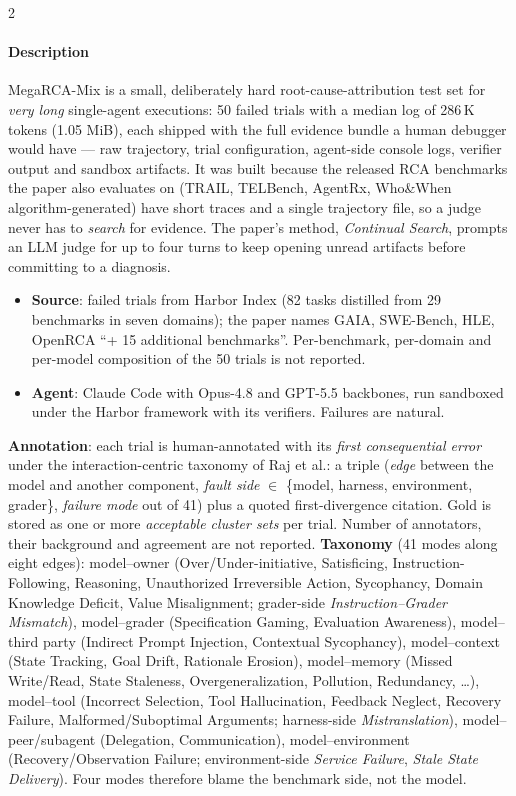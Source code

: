 \begin{multicols}{2}
\paragraph{Description} MegaRCA-Mix is a small, deliberately hard root-cause-attribution test set for \emph{very long} single-agent executions: 50 failed trials with a median log of 286\,K tokens (1.05 MiB), each shipped with the full evidence bundle a human debugger would have --- raw trajectory, trial configuration, agent-side console logs, verifier output and sandbox artifacts. It was built because the released RCA benchmarks the paper also evaluates on (TRAIL, TELBench, AgentRx, Who\&When algorithm-generated) have short traces and a single trajectory file, so a judge never has to \emph{search} for evidence. The paper's method, \emph{Continual Search}, prompts an LLM judge for up to four turns to keep opening unread artifacts before committing to a diagnosis.
\begin{itemize}
\item \textbf{Source}: failed trials from Harbor Index (82 tasks distilled from 29 benchmarks in seven domains); the paper names GAIA, SWE-Bench, HLE, OpenRCA ``+ 15 additional benchmarks''. Per-benchmark, per-domain and per-model composition of the 50 trials is not reported.
\item \textbf{Agent}: Claude Code with Opus-4.8 and GPT-5.5 backbones, run sandboxed under the Harbor framework with its verifiers. Failures are natural.
\end{itemize}
\textbf{Annotation}: each trial is human-annotated with its \emph{first consequential error} under the interaction-centric taxonomy of Raj et al.: a triple (\emph{edge} between the model and another component, \emph{fault side} $\in$ \{model, harness, environment, grader\}, \emph{failure mode} out of 41) plus a quoted first-divergence citation. Gold is stored as one or more \emph{acceptable cluster sets} per trial. Number of annotators, their background and agreement are not reported. \textbf{Taxonomy} (41 modes along eight edges): model--owner (Over/Under-initiative, Satisficing, Instruction-Following, Reasoning, Unauthorized Irreversible Action, Sycophancy, Domain Knowledge Deficit, Value Misalignment; grader-side \emph{Instruction--Grader Mismatch}), model--grader (Specification Gaming, Evaluation Awareness), model--third party (Indirect Prompt Injection, Contextual Sycophancy), model--context (State Tracking, Goal Drift, Rationale Erosion), model--memory (Missed Write/Read, State Staleness, Overgeneralization, Pollution, Redundancy, \ldots), model--tool (Incorrect Selection, Tool Hallucination, Feedback Neglect, Recovery Failure, Malformed/Suboptimal Arguments; harness-side \emph{Mistranslation}), model--peer/subagent (Delegation, Communication), model--environment (Recovery/Observation Failure; environment-side \emph{Service Failure}, \emph{Stale State Delivery}). Four modes therefore blame the benchmark side, not the model.


\end{multicols}
